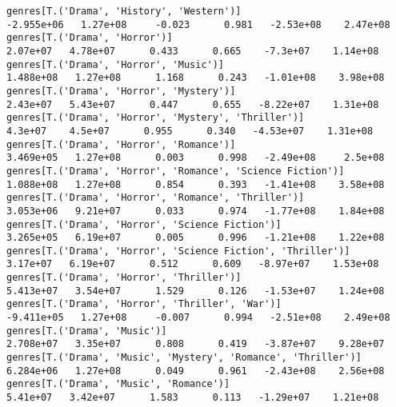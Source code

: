 \documentclass[11pt]{article}
\begin{document}
\begin{Verbatim}[commandchars=\\\{\}]
genres[T.('Drama', 'History', 'Western')]                                                                    -2.955e+06   1.27e+08     -0.023      0.981   -2.53e+08    2.47e+08
genres[T.('Drama', 'Horror')]                                                                                  2.07e+07   4.78e+07      0.433      0.665    -7.3e+07    1.14e+08
genres[T.('Drama', 'Horror', 'Music')]                                                                        1.488e+08   1.27e+08      1.168      0.243   -1.01e+08    3.98e+08
genres[T.('Drama', 'Horror', 'Mystery')]                                                                       2.43e+07   5.43e+07      0.447      0.655   -8.22e+07    1.31e+08
genres[T.('Drama', 'Horror', 'Mystery', 'Thriller')]                                                            4.3e+07    4.5e+07      0.955      0.340   -4.53e+07    1.31e+08
genres[T.('Drama', 'Horror', 'Romance')]                                                                      3.469e+05   1.27e+08      0.003      0.998   -2.49e+08     2.5e+08
genres[T.('Drama', 'Horror', 'Romance', 'Science Fiction')]                                                   1.088e+08   1.27e+08      0.854      0.393   -1.41e+08    3.58e+08
genres[T.('Drama', 'Horror', 'Romance', 'Thriller')]                                                          3.053e+06   9.21e+07      0.033      0.974   -1.77e+08    1.84e+08
genres[T.('Drama', 'Horror', 'Science Fiction')]                                                              3.265e+05   6.19e+07      0.005      0.996   -1.21e+08    1.22e+08
genres[T.('Drama', 'Horror', 'Science Fiction', 'Thriller')]                                                   3.17e+07   6.19e+07      0.512      0.609   -8.97e+07    1.53e+08
genres[T.('Drama', 'Horror', 'Thriller')]                                                                     5.413e+07   3.54e+07      1.529      0.126   -1.53e+07    1.24e+08
genres[T.('Drama', 'Horror', 'Thriller', 'War')]                                                             -9.411e+05   1.27e+08     -0.007      0.994   -2.51e+08    2.49e+08
genres[T.('Drama', 'Music')]                                                                                  2.708e+07   3.35e+07      0.808      0.419   -3.87e+07    9.28e+07
genres[T.('Drama', 'Music', 'Mystery', 'Romance', 'Thriller')]                                                6.284e+06   1.27e+08      0.049      0.961   -2.43e+08    2.56e+08
genres[T.('Drama', 'Music', 'Romance')]                                                                        5.41e+07   3.42e+07      1.583      0.113   -1.29e+07    1.21e+08

\end{Verbatim}
\end{document}
